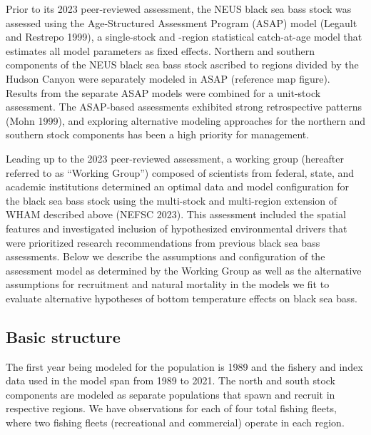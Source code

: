 \documentclass[
]{article}
\begin{document}
Prior to its 2023 peer-reviewed assessment, the NEUS black sea bass
stock was assessed using the Age-Structured Assessment Program (ASAP)
model (Legault and Restrepo 1999), a single-stock and -region
statistical catch-at-age model that estimates all model parameters as
fixed effects. Northern and southern components of the NEUS black sea
bass stock ascribed to regions divided by the Hudson Canyon were
separately modeled in ASAP (reference map figure). Results from the
separate ASAP models were combined for a unit-stock assessment. The
ASAP-based assessments exhibited strong retrospective patterns (Mohn
1999), and exploring alternative modeling approaches for the northern
and southern stock components has been a high priority for management.

Leading up to the 2023 peer-reviewed assessment, a working group
(hereafter referred to as ``Working Group'') composed of scientists from
federal, state, and academic institutions determined an optimal data and
model configuration for the black sea bass stock using the multi-stock
and multi-region extension of WHAM described above (NEFSC 2023). This
assessment included the spatial features and investigated inclusion of
hypothesized environmental drivers that were prioritized research
recommendations from previous black sea bass assessments. Below we
describe the assumptions and configuration of the assessment model as
determined by the Working Group as well as the alternative assumptions
for recruitment and natural mortality in the models we fit to evaluate
alternative hypotheses of bottom temperature effects on black sea bass.

\hypertarget{basic-structure}{%
\subsection*{Basic structure}\label{basic-structure}}

The first year being modeled for the population is 1989 and the fishery
and index data used in the model span from 1989 to 2021. The north and
south stock components are modeled as separate populations that spawn
and recruit in respective regions. We have observations for each of four
total fishing fleets, where two fishing fleets (recreational and
commercial) operate in each region.
\end{document}
